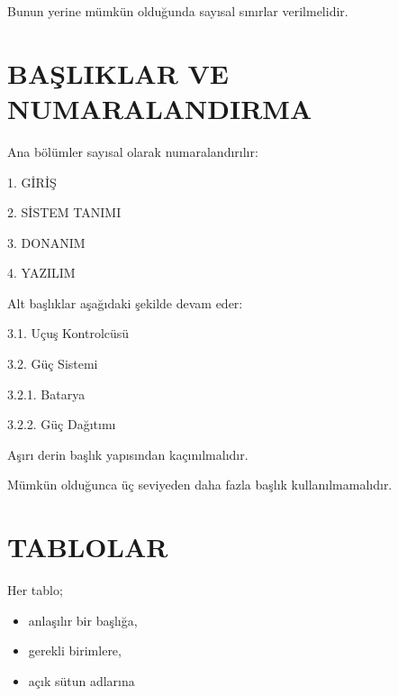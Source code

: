 \documentclass[11pt,a4paper]{article}
\begin{document}
Bunun yerine mümkün olduğunda sayısal sınırlar verilmelidir.


\newpage

\section{BAŞLIKLAR VE NUMARALANDIRMA}

Ana bölümler sayısal olarak numaralandırılır:

\begin{center}

1. GİRİŞ

2. SİSTEM TANIMI

3. DONANIM

4. YAZILIM

\end{center}

Alt başlıklar aşağıdaki şekilde devam eder:

\begin{center}

3.1. Uçuş Kontrolcüsü

3.2. Güç Sistemi

3.2.1. Batarya

3.2.2. Güç Dağıtımı

\end{center}

Aşırı derin başlık yapısından kaçınılmalıdır.

Mümkün olduğunca üç seviyeden daha fazla başlık kullanılmamalıdır.


\newpage

\section{TABLOLAR}

Her tablo;

\begin{itemize}
    \item anlaşılır bir başlığa,
    \item gerekli birimlere,
    \item açık sütun adlarına
\end{itemize}
\end{document}
